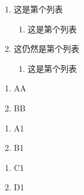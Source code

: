 ﻿\documentclass{article}
\begin{document}
\hrulefill%

    \begin{enumerate}
        \item 这是第\EnumitemId{}个列表
        \begin{enumerate}
            \item 这是第\EnumitemId{}个列表
        \end{enumerate}
        \item 这仍然是第\EnumitemId{}个列表
        \begin{enumerate}
            \item 这是第\EnumitemId{}个列表
        \end{enumerate}
    \end{enumerate}

\hrulefill%

    \begin{enumerate}[label=(\chinese*)]
        \item AA
        \item BB
    \end{enumerate}

\dotfill

    \begin{enumerate}
        \item A1
        \item B1
    \end{enumerate}

    \begin{enumerate}[resume]
        \item C1
        \item D1
    \end{enumerate}
\end{document}
